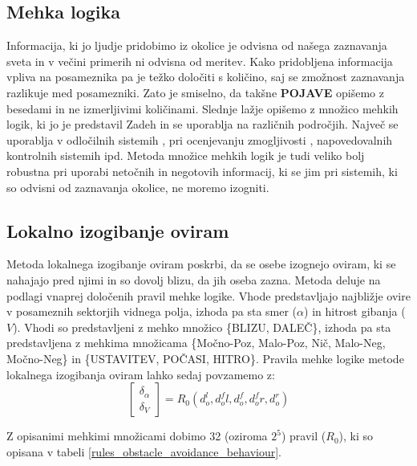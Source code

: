 \documentclass[9pt]{pnas-new}
\begin{document}
\subsection*{Mehka logika}
\label{mehka_logika}
Informacija, ki jo ljudje pridobimo iz okolice je odvisna od našega zaznavanja sveta in v večini primerih ni odvisna od meritev. Kako pridobljena informacija vpliva na posameznika pa je težko določiti s količino, saj se zmožnost zaznavanja razlikuje med posamezniki. Zato je smiselno, da takšne \textbf{POJAVE} opišemo z besedami in ne izmerljivimi količinami. Slednje lažje opišemo z množico mehkih logik, ki jo je predstavil Zadeh \cite{ZADEH1965338} in se uporablja na različnih področjih. Največ se uporablja v odločilnih sistemih \cite{Dong2013}, pri ocenjevanju zmogljivosti \cite{HWWDGHJZN1969}, napovedovalnih kontrolnih sistemih \cite{en10060794} ipd. Metoda množice mehkih logik je tudi veliko bolj robustna pri uporabi netočnih in negotovih informacij, ki se jim pri sistemih, ki so odvisni od zaznavanja okolice, ne moremo izogniti.

\subsection*{Lokalno izogibanje oviram}
\label{lokalno_izogibanje_oviram}
Metoda lokalnega izogibanje oviram poskrbi, da se osebe izognejo oviram, ki se nahajajo pred njimi in so dovolj blizu, da jih oseba zazna. Metoda deluje na podlagi vnaprej določenih pravil mehke logike. Vhode predstavljajo najbližje ovire v posameznih sektorjih vidnega polja, izhoda pa sta smer ($\alpha$) in hitrost gibanja ($V$). Vhodi so predstavljeni z mehko množico \{BLIZU, DALEČ\}, izhoda pa sta predstavljena z mehkima množicama \{Močno-Poz, Malo-Poz, Nič, Malo-Neg, Močno-Neg\} in \{USTAVITEV, POČASI, HITRO\}. Pravila mehke logike metode lokalnega izogibanja oviram lahko sedaj povzamemo z:
\begin{equation}
\label{lokalno_izogibanje_oviram_summarize}
\begin{bmatrix}
\delta_{\alpha}\\
\delta_{V}
\end{bmatrix} = R_{0} (d_{o}^l, d_{o}^fl, d_{o}^f, d_{o}^fr, d_{o}^r)
\end{equation}

Z opisanimi mehkimi množicami dobimo 32 (oziroma $2^5$) pravil ($R_0$), ki so opisana v tabeli \ref{rules_obstacle_avoidance_behaviour}.
\end{document}
